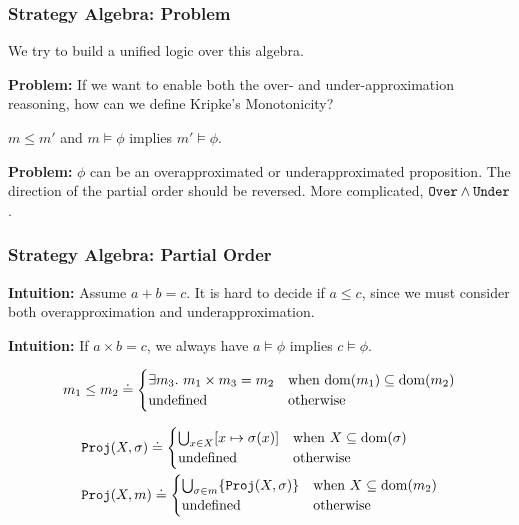 \begin{frame}[fragile]
    \frametitle{Strategy Algebra: Problem}

We try to build a unified logic over this algebra.

\textbf{Problem:} If we want to enable both the over- and under-approximation reasoning, how can we define Kripke's Monotonicity?

\begin{lemma}
    $m \leq m'$ and $m \models\phi$ implies $m' \models\phi$.
\end{lemma}

\textbf{Problem:} $\phi$ can be an overapproximated or underapproximated proposition. The direction of the partial order should be reversed. More complicated, ${\tt Over} \land {\tt Under}$.
    
\end{frame}

\begin{frame}[fragile]
    \frametitle{Strategy Algebra: Partial Order}

\textbf{Intuition:} Assume $a + b = c$. It is hard to decide if $a \leq c$, since we must consider both overapproximation and underapproximation.

\textbf{Intuition:} If $a \times b = c$, we always have $a \models\phi$ implies $c \models\phi$.

\begin{definition}
    \[
    m_1 \leq m_2 \doteq
    \begin{cases}
        \exists m_3.\ m_1 \times m_3 = m_2 & \text{when } \mathrm{dom}(m_1) \subseteq \mathrm{dom}(m_2) \\
        \text{undefined} & \text{otherwise}
    \end{cases}
    \]
\end{definition}

\begin{definition}[Projection]
    \begin{align*}
    &{\tt Proj}(X, \sigma) \doteq
        \begin{cases}
            \bigcup_{x \in X} [x\mapsto \sigma(x)] & \text{when } X \subseteq \mathrm{dom}(\sigma) \\
            \text{undefined} & \text{otherwise}
        \end{cases}
    \\&{\tt Proj}(X, m) \doteq
    \begin{cases}
        \bigcup_{\sigma \in m} \{ {\tt Proj}(X, \sigma) \} & \text{when } X \subseteq \mathrm{dom}(m_2) \\
        \text{undefined} & \text{otherwise}
    \end{cases}
    \end{align*}
\end{definition}

\end{frame}

